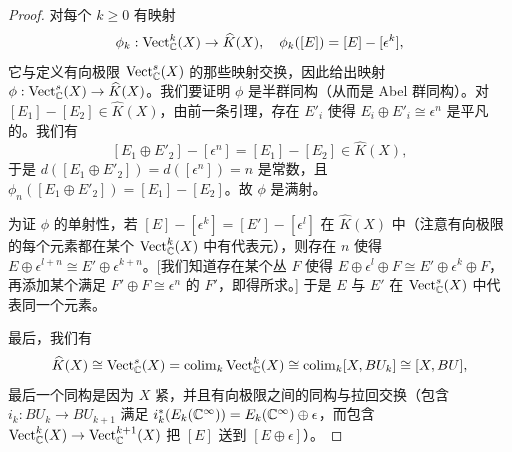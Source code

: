 \begin{proof}
对每个 $k\ge 0$ 有映射
\[ \phi_k: \mathrm{Vect}^k_{\mathbb{C}}(X)\to\widehat K(X),\quad \phi_k([E]) = [E] - [\epsilon^k], \]
它与定义有向极限 $\mathrm{Vect}^s_{\mathbb{C}}(X)$ 的那些映射交换，因此给出映射 $\phi: \mathrm{Vect}^s_{\mathbb{C}}(X)\to\widehat K(X)$。我们要证明 $\phi$ 是半群同构（从而是 Abel 群同构）。对 $[E_1]-[E_2]\in\widehat K(X)$，由前一条引理，存在 $E'_i$ 使得 $E_i\oplus E'_i\cong \epsilon^n$ 是平凡的。我们有
\[ [E_1\oplus E'_2] - [\epsilon^n] = [E_1]-[E_2]\in\widehat K(X), \]
于是 $d([E_1\oplus E'_2]) = d([\epsilon^n]) = n$ 是常数，且 $\phi_n([E_1\oplus E'_2]) = [E_1]-[E_2]$。故 $\phi$ 是满射。

为证 $\phi$ 的单射性，若 $[E]-[\epsilon^k] = [E']-[\epsilon^l]$ 在 $\widehat K(X)$ 中（注意有向极限的每个元素都在某个 $\mathrm{Vect}^k_{\mathbb{C}}(X)$ 中有代表元），则存在 $n$ 使得 $E\oplus \epsilon^{l+n}\cong E'\oplus \epsilon^{k+n}$。[我们知道存在某个丛 $F$ 使得 $E\oplus \epsilon^l\oplus F\cong E'\oplus \epsilon^k\oplus F$，再添加某个满足 $F'\oplus F\cong \epsilon^n$ 的 $F'$，即得所求。] 于是 $E$ 与 $E'$ 在 $\mathrm{Vect}^s_{\mathbb{C}}(X)$ 中代表同一个元素。

最后，我们有
\[ \widehat K(X)\cong \mathrm{Vect}^s_{\mathbb{C}}(X) = \operatorname{colim}_k \mathrm{Vect}^k_{\mathbb{C}}(X)\cong \operatorname{colim}_k [X, BU_k]\cong [X, BU], \]
最后一个同构是因为 $X$ 紧，并且有向极限之间的同构与拉回交换（包含 $i_k: BU_k\to BU_{k+1}$ 满足 $i_k^*(E_k(\mathbb{C}^\infty)) = E_k(\mathbb{C}^\infty)\oplus \epsilon$，而包含 $\mathrm{Vect}^k_{\mathbb{C}}(X)\to\mathrm{Vect}^{k+1}_{\mathbb{C}}(X)$ 把 $[E]$ 送到 $[E\oplus\epsilon]$）。
\end{proof}




